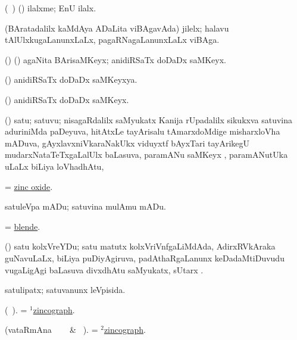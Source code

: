 \bentry
{} 
\gl{\nA}
\bmng
(\kanmu\ \ame) (\ashi) ilalxme; EnU ilalx.
\emng
\eentry

\bentry
{} 
\gl{\nA} 
\bmng
(BAratadalilx kaMdAya ADaLita viBAgavAda) jilelx; halavu  tAlUlxkugaLanunxLaLx, pagaRNagaLanunxLaLx viBAga.
\emng
\eentry

\bentry
{} 
\gl{\nA}  
\bmng
(\ame) (\AmA) agaNita BArisaMKeyx; anidiRSaTx doDaDx saMKeyx.
\emng
\eentry

\bentry
{} 
\gl{\gu}  
\bmng
(\ame) anidiRSaTx doDaDx saMKeyxya.
\emng
\eentry

\bentry
{} 
\gl{\nA}  
\bmng
(\ame) anidiRSaTx doDaDx saMKeyx.
\emng
\eentry

\bentry
{} 
\gl{\nA}
\bmng
(\ravi) satu; satuvu; nisagaRdalilx saMyukatx Kanija rUpadalilx sikukxva satuvina aduriniMda paDeyuva,  hitAtxLe tayArisalu tAmarxdoMdige misharxloVha mADuva, gAyxlavxniVkaraNakUkx viduyxtf bAyxTari tayArikegU mudarxNataTeTxgaLalUlx baLasuva, paramANu saMKeyx , paramANutUka  uLaLx biLiya loVhadhAtu, \saMkeV\  
\emng

\noindent
\gl{\pagu} 
\bmng
{} 
 = \hyperlink{zinc oxide}{zinc oxide}.
\emng
\eentry

\bentry
{} 
\gl{\sakirx} 
\bmng
satuleVpa mADu; satuvina mulAmu mADu.
\emng
\eentry

\bentry
{}  
\gl{\nA} 
\bmng
= \hyperref{kandict_b.pdf}{B}{blende}{blende}.
\emng
\eentry

\bentry
{}  
\gl{\nA} 
\bmng
(\ravi) satu kolxVreYDu; satu matutx kolxVriVnfgaLiMdAda, AdirxRVkAraka guNavuLaLx, biLiya puDiyAgiruva, padAthaRgaLanunx keDadaMtiDuvudu \mo vugaLigAgi baLasuva divxdhAtu saMyukatx, sUtarx  .
\emng
\eentry

\bentry
{} 
\gl{\gu}
\bmng
satulipatx; satuvanunx leVpisida.
\emng
\eentry

\bentry
{} 
\gl{\nA} 
\bmng
(\bava\ ). 
= \hyperlink{zincograph(1)}{$^1$zincograph}.
\emng
\eentry

\bentry
{} 
\gl{\sakirx} 
\bmng
(vataRmAna \parxpu\ \Eva\   \BU\ \& \BUkaq\ ).  
= \hyperlink{zincograph(2)}{$^2$zincograph}.
\emng
\eentry

